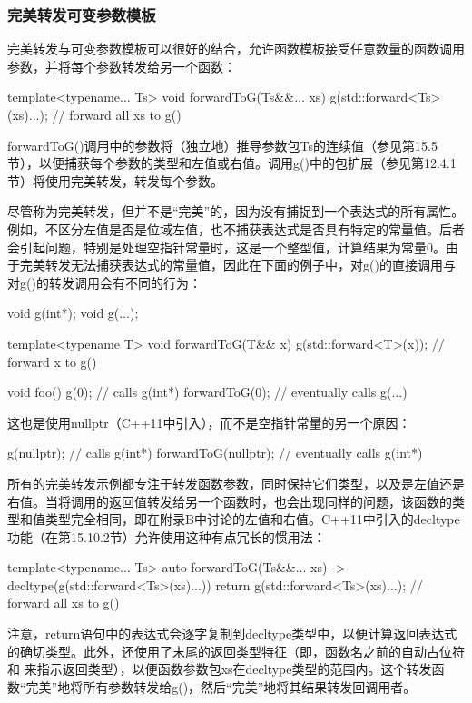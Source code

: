 \subsubsection{完美转发可变参数模板}

完美转发与可变参数模板可以很好的结合，允许函数模板接受任意数量的函数调用参数，并将每个参数转发给另一个函数：

\begin{cpp}
template<typename... Ts> void forwardToG(Ts&&... xs) {
	g(std::forward<Ts>(xs)...); // forward all xs to g()
}
\end{cpp}

forwardToG()调用中的参数将（独立地）推导参数包Ts的连续值（参见第15.5节），以便捕获每个参数的类型和左值或右值。调用g()中的包扩展（参见第12.4.1节）将使用完美转发，转发每个参数。

尽管称为完美转发，但并不是“完美”的，因为没有捕捉到一个表达式的所有属性。例如，不区分左值是否是位域左值，也不捕获表达式是否具有特定的常量值。后者会引起问题，特别是处理空指针常量时，这是一个整型值，计算结果为常量0。由于完美转发无法捕获表达式的常量值，因此在下面的例子中，对g()的直接调用与对g()的转发调用会有不同的行为：

\begin{cpp}
void g(int*);
void g(...);

template<typename T> void forwardToG(T&& x) {
	g(std::forward<T>(x)); // forward x to g()
}

void foo() {
	g(0); // calls g(int*)
	forwardToG(0); // eventually calls g(...)
}
\end{cpp}

这也是使用nullptr（C++11中引入），而不是空指针常量的另一个原因：

\begin{cpp}
g(nullptr); // calls g(int*)
forwardToG(nullptr); // eventually calls g(int*)
\end{cpp}

所有的完美转发示例都专注于转发函数参数，同时保持它们类型，以及是左值还是右值。当将调用的返回值转发给另一个函数时，也会出现同样的问题，该函数的类型和值类型完全相同，即在附录B中讨论的左值和右值。C++11中引入的decltype功能（在第15.10.2节）允许使用这种有点冗长的惯用法：

\begin{cpp}
template<typename... Ts>
auto forwardToG(Ts&&... xs) -> decltype(g(std::forward<Ts>(xs)...)) {
	return g(std::forward<Ts>(xs)...); // forward all xs to g()
}
\end{cpp}

注意，return语句中的表达式会逐字复制到decltype类型中，以便计算返回表达式的确切类型。此外，还使用了末尾的返回类型特征（即，函数名之前的自动占位符和 \inlcpp{->} 来指示返回类型），以便函数参数包xs在decltype类型的范围内。这个转发函数“完美”地将所有参数转发给g()，然后“完美”地将其结果转发回调用者。

